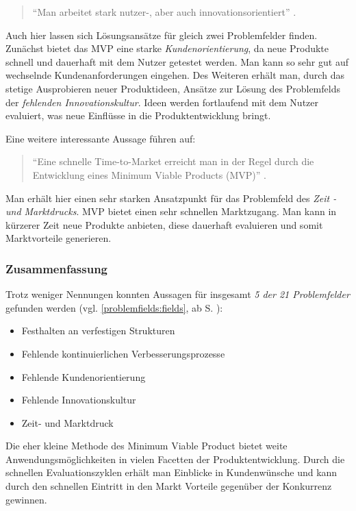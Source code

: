 \begin{quote}
	``Man arbeitet stark  nutzer-, aber auch innovationsorientiert'' \cite[S. 13]{chanias_digital_2018}.
\end{quote}

Auch hier lassen sich Lösungsansätze für gleich zwei Problemfelder finden. Zunächst bietet das MVP eine starke \textit{Kundenorientierung}, da neue Produkte schnell und dauerhaft mit dem Nutzer getestet werden. Man kann so sehr gut auf wechselnde Kundenanforderungen eingehen. Des Weiteren erhält man, durch das stetige Ausprobieren neuer Produktideen, Ansätze zur Lösung des Problemfelds der \textit{fehlenden Innovationskultur}. Ideen werden fortlaufend mit dem Nutzer evaluiert, was neue Einflüsse in die Produktentwicklung bringt.

Eine weitere interessante Aussage führen  auf:

\begin{quote}
	``Eine schnelle Time-to-Market erreicht man in der Regel durch die Entwicklung eines Minimum Viable Products (MVP)'' \cite[S. 213]{gassmann_digitale_2016}.
\end{quote}

Man erhält hier einen sehr starken Ansatzpunkt für das Problemfeld des \textit{Zeit - und Marktdrucks}. MVP bietet einen sehr schnellen Marktzugang. Man kann in kürzerer Zeit neue Produkte anbieten, diese dauerhaft evaluieren und somit Marktvorteile generieren.

\subsubsection{Zusammenfassung}

Trotz weniger Nennungen konnten Aussagen für insgesamt \textit{5 der 21 Problemfelder} gefunden werden (vgl. \ref{problemfields:fields}, ab S. \pageref{problemfields:fields}):

 \begin{itemize}[noitemsep, topsep=0pt]
	\item Festhalten an verfestigen Strukturen
	\item Fehlende kontinuierlichen Verbesserungsprozesse
	\item Fehlende Kundenorientierung
	\item Fehlende Innovationskultur
	\item Zeit- und Marktdruck
\end{itemize}

Die eher kleine Methode des Minimum Viable Product bietet weite Anwendungsmöglichkeiten in vielen Facetten der Produktentwicklung. Durch die schnellen Evaluationszyklen erhält man Einblicke in Kundenwünsche und kann durch den schnellen Eintritt in den Markt Vorteile gegenüber der Konkurrenz gewinnen.

